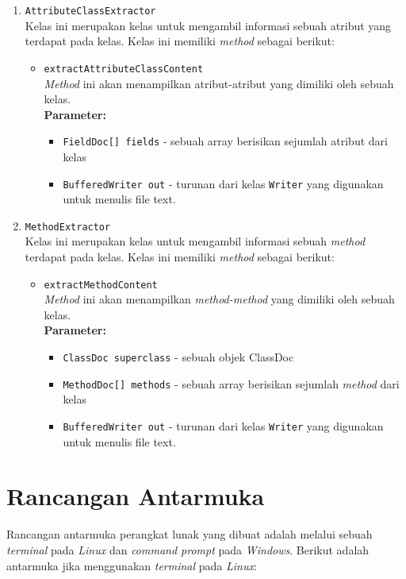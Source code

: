 \begin{enumerate}
	\item {\texttt{AttributeClassExtractor}}\\
	Kelas ini merupakan kelas untuk mengambil informasi sebuah atribut yang terdapat pada kelas. Kelas ini memiliki {\it method} sebagai berikut:
	\begin{itemize}
		\item \texttt{extractAttributeClassContent}\\
		{\it Method} ini akan menampilkan atribut-atribut yang dimiliki oleh sebuah kelas.\\
		\textbf{Parameter:}\\
		\begin{itemize}
			\item \texttt{FieldDoc[] fields} - sebuah array berisikan sejumlah atribut dari kelas
			\item \texttt{BufferedWriter out} - turunan dari kelas \texttt{Writer} yang digunakan untuk menulis file text.
		\end{itemize}
	\end{itemize}

	
	\item {\texttt{MethodExtractor}}\\
	Kelas ini merupakan kelas untuk mengambil informasi sebuah {\it method} terdapat pada kelas. Kelas ini memiliki {\it method} sebagai berikut:
	\begin{itemize}
		\item \texttt{extractMethodContent}\\
		{\it Method} ini akan menampilkan {\it method-method} yang dimiliki oleh sebuah kelas.\\
		\textbf{Parameter:}
		\begin{itemize}
			\item \texttt{ClassDoc superclass} - sebuah objek ClassDoc
			\item \texttt{MethodDoc[] methods} - sebuah array berisikan sejumlah {\it method} dari kelas
			\item \texttt{BufferedWriter out} - turunan dari kelas \texttt{Writer} yang digunakan untuk menulis file text.
		\end{itemize}
	\end{itemize}
	
\end{enumerate}

\section{Rancangan Antarmuka}
\label{sec:antarmuka}
Rancangan antarmuka perangkat lunak yang dibuat adalah melalui sebuah {\it terminal} pada {\it Linux} dan {\it command prompt} pada {\it Windows}. Berikut adalah antarmuka jika menggunakan {\it terminal} pada {\it Linux}: 

